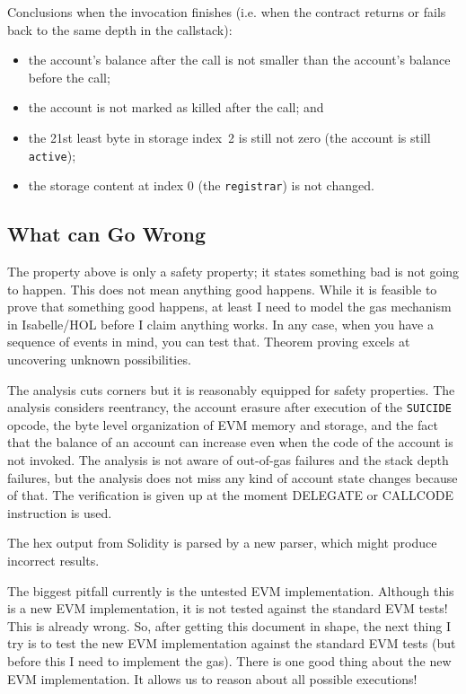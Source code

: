 \documentclass[11pt,a4paper]{article}
\begin{document}
Conclusions when the invocation finishes (i.e. when the contract returns or fails back to the same depth in the callstack):
\begin{itemize}
  \item the account's balance after the call is not smaller than the
    account's balance before the call;
  \item the account is not marked as killed after the call; and
  \item the 21st least byte in storage index~2 is still not zero (the account is still \texttt{active});
  \item the storage content at index 0 (the \texttt{registrar}) is not changed.
\end{itemize}


\subsection{What can Go Wrong}

The property above is only a safety property; it states something bad is not going to happen.  This does not mean anything good happens.  While it is feasible to prove that something good happens, at least I need to model the gas mechanism in Isabelle/HOL before I claim anything works.  In any case, when you have a sequence of events in mind, you can test that.  Theorem proving excels at uncovering unknown possibilities.

The analysis cuts corners but it is reasonably equipped for safety
properties.  The analysis considers reentrancy, the account erasure after execution
of the \texttt{SUICIDE} opcode, the byte level organization of EVM
memory and storage, and the fact that the balance of an account can
increase even when the code of the account is not invoked.
The analysis is not aware of out-of-gas failures and the stack depth
failures, but the analysis does not miss any kind of account state
changes because of that.  The verification is given up at the moment
DELEGATE or CALLCODE instruction is used.

The hex output from Solidity is parsed by a new parser, which might produce incorrect results.

The biggest pitfall currently is the untested EVM implementation.
Although this is a new EVM implementation, it is not
tested against the standard EVM tests!  This is already wrong.
So, after getting this document in shape, the next thing I try is to
test the new EVM implementation against the standard EVM tests (but before this I need to implement the gas).
There is one good thing about the new EVM implementation. It allows us to reason about all possible executions!
\end{document}
